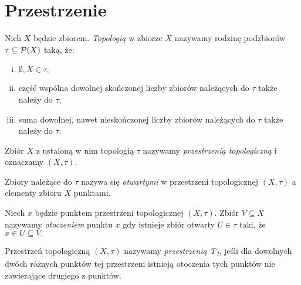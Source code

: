 \chapter{Przestrzenie}{
    \label{chp:spaces}
    \begin{definition}[Topologia]
        \label{def:topology}
        Nich $X$ będzie zbiorem. \emph{Topologią} w zbiorze $X$ nazywamy rodzinę podzbiorów $\tau\subseteq\mathcal{P}(X)$ taką, że:
        \begin{enumerate}[(i)]
            \item $\emptyset, X \in \tau,$
            \item część wspólna dowolnej skończonej liczby zbiorów należących do $\tau$ także należy do $\tau$,
            \item suma dowolnej, nawet nieskończonej liczby zbiorów należących do $\tau$ także należy do $\tau$.
        \end{enumerate}
    \end{definition}
    \begin{definition}
        \label{def:topological_space}
        Zbiór $X$ z ustaloną w nim topologią $\tau$ nazywamy \emph{przestrzenią topologiczną} i oznaczamy $(X, \tau)$.
    \end{definition}
    Zbiory należące do $\tau$ nazywa się \emph{otwartymi} w przestrzeni topologicznej $(X, \tau)$ a elementy zbioru $X$ punktami.
    \begin{definition}
        \label{def:neighbourhood_tological_space}
        Niech $x$ będzie punktem przestrzeni topologicznej $(X, \tau)$. Zbiór $V\subseteq X$ nazywamy \emph{otoczeniem} punktu $x$ gdy istnieje zbiór otwarty $U\in\tau$ taki, że $x\in U\subseteq V.$ 
    \end{definition}
    \begin{definition}
        \label{def:t_1_space}
        Przestrzeń topologiczną $(X, \tau)$ nazywamy \emph{przestrzenią T\textsubscript{1}}, jeśli dla dowolnych dwóch różnych punktów tej przestrzeni istnieją otoczenia tych punktów nie zawierające drugiego z punktów.  
    \end{definition}
}